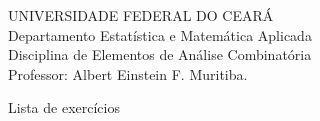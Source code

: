 \documentclass[a4paper,12pt]{letter}  %
\begin{document}
UNIVERSIDADE FEDERAL DO CEARÁ\\
Departamento Estatística e Matemática Aplicada\\
Disciplina de Elementos de Análise Combinatória\\
Professor: Albert Einstein F. Muritiba.\\

\begin{center}
	Lista de exercícios
\end{center}
\end{document}
